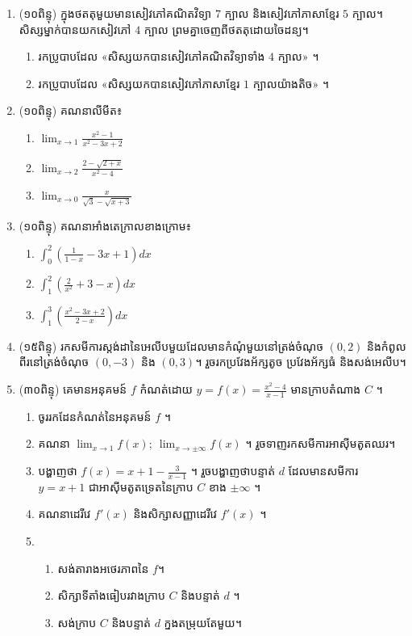 \documentclass{officialexam}
\begin{document}
\begin{enumerate}[I]
\item (១០ពិន្ទុ) ក្នុងថតតុមួយមានសៀវភៅគណិតវិទ្យា $7$ ក្បាល និងសៀវភៅភាសាខ្មែរ $5$ ក្បាល។  សិស្សម្នាក់បានយកសៀវភៅ $4$ ក្បាល ព្រមគ្នាចេញពីថតតុដោយចៃដន្យ។
\begin{enumerate}[k]
\item រកប្រូបាបដែល «សិស្សយកបានសៀវភៅគណិតវិទ្យាទាំង $4$ ក្បាល» ។
\item រកប្រូបាបដែល «សិស្សយកបានសៀវភៅភាសាខ្មែរ $1$ ក្បាលយ៉ាងតិច» ។
\end{enumerate}
\item (១០ពិន្ទុ) គណនាលីមីត៖
\begin{enumerate}[k,3]
\item $\lim_{x\to 1}\frac{x^2-1}{x^2-3x+2}$
\item $\lim_{x\to 2}\frac{2-\sqrt{2+x}}{x^2-4}$
\item  $\lim_{x\to 0}\frac{x}{\sqrt{3}-\sqrt{x+3}}$
\end{enumerate} 
\item (១០ពិន្ទុ) គណនាអាំងតេក្រាលខាងក្រោម៖
\begin{enumerate}[k,3]
\item $\int_0^2 \left(\frac{1}{1-x}-3x+1\right)dx$
\item $\int_1^2 \left(\frac{2}{x^2}+3-x\right)dx$
\item $\int_1^3 \left(\frac{x^2-3x+2}{2-x}\right) dx$
\end{enumerate}
\item (១៥ពិន្ទុ) រកសមីការស្តង់ដានៃអេលីបមួយដែលមានកំណុំមួយនៅត្រង់ចំណុច $(0,2)$ និងកំពូលពីរនៅត្រង់ចំណុច $(0,-3)$ និង $(0,3)$។ រួចរកប្រវែងអ័ក្សតូច ប្រវែងអ័ក្សធំ និងសង់អេលីប។
\item (៣០ពិន្ទុ) គេមានអនុគមន៍ $f$ កំណត់ដោយ $y=f(x)=\frac{x^2-4}{x-1}$   មានក្រាបតំណាង $C$ ។
\begin{enumerate}[m]
\item ចូររកដែនកំណត់នៃអនុគមន៍ $f$ ។
\item គណនា $\lim_{x\to 1}f(x);\ \lim_{x\to \pm\infty}f(x)$ ។ រួចទាញរកសមីការអាស៊ីមតូតឈរ។
\item បង្ហាញថា $f(x)=x+1-\frac{3}{x-1}$ ។ រួចបង្ហាញថាបន្ទាត់ $d$ ដែលមានសមីការ $y=x+1$ ជាអាស៊ីមតូតទ្រេតនៃក្រាប $C$ ខាង $\pm\infty$ ។
\item គណនាដេរីវេ $f'(x)$ និងសិក្សាសញ្ញាដេរីវេ $f'(x)$ ។
\item 
\begin{enumerate}[k]
\item សង់តារាងអថេរភាពនៃ $f$។ 
\item សិក្សាទីតាំងធៀបរវាងក្រាប $C$ និងបន្ទាត់ $d$ ។
\item សង់ក្រាប $C$ និងបន្ទាត់ $d$ ក្នងតម្រុយតែមួយ។
\end{enumerate}
\end{enumerate}
\end{enumerate}
 \newpage 
{}
\end{document}
